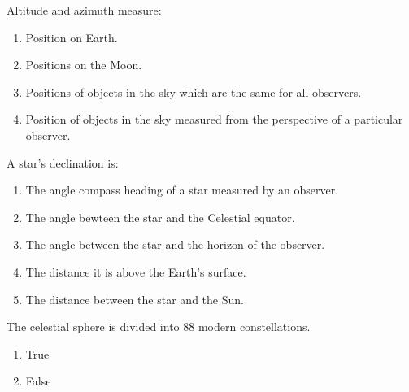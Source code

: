 \documentclass[11pt]{article}
\begin{document}
\begin{enumerate}
\begin{minipage}{\textwidth}
\begin{minipage}{\textwidth}
\item Altitude and azimuth measure:
\begin{enumerate} 
\setlength{\itemsep}{1pt} 
\setlength{\parskip}{0pt} 
\setlength{\parsep}{0pt}
\setlength{\multicolsep}{1pt} 
\item Position on Earth.
\item Positions on the Moon.
\item Positions of objects in the sky which are the same for all observers.
\item Position of objects in the sky measured from the perspective of a particular observer.
\end{enumerate} 
\end{minipage}
\end{minipage}
\vskip 0.20in

\begin{minipage}{\textwidth}
\begin{minipage}{\textwidth}
\item A star's declination is:
\begin{enumerate} 
\setlength{\itemsep}{1pt} 
\setlength{\parskip}{0pt} 
\setlength{\parsep}{0pt}
\setlength{\multicolsep}{1pt} 
\item The angle compass heading of a star measured by an observer.
\item The angle bewteen the star and the Celestial equator.
\item The angle between the star and the horizon of the observer.
\item The distance it is above the Earth's surface.
\item The distance between the star and the Sun.
\end{enumerate} 
\end{minipage}
\end{minipage}
\vskip 0.20in

\begin{minipage}{\textwidth}
\begin{minipage}{\textwidth}
\item The celestial sphere is divided into 88 modern constellations.
\begin{multicols}{3}
\begin{enumerate} 
\setlength{\itemsep}{1pt} 
\setlength{\parskip}{0pt} 
\setlength{\parsep}{0pt}
\setlength{\multicolsep}{1pt} 
\item True
\item False
\end{enumerate} 
\vfill 
\end{multicols}


\end{minipage}
\end{minipage}
\end{enumerate}
\end{document}
